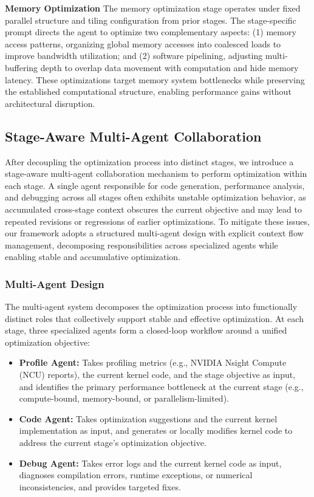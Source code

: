 \documentclass{article}
\theoremstyle{plain}
\theoremstyle{definition}
\theoremstyle{remark}
\begin{document}
\textbf{Memory Optimization}
The memory optimization stage operates under fixed parallel structure and tiling configuration from prior stages. The stage-specific prompt directs the agent to optimize two complementary aspects: (1) memory access patterns, organizing global memory accesses into coalesced loads to improve bandwidth utilization; and (2) software pipelining, adjusting multi-buffering depth to overlap data movement with computation and hide memory latency. These optimizations target memory system bottlenecks while preserving the established computational structure, enabling performance gains without architectural disruption.

\subsection{Stage-Aware Multi-Agent Collaboration}

After decoupling the optimization process into distinct stages, we introduce a stage-aware multi-agent collaboration mechanism to perform optimization within each stage. A single agent responsible for code generation, performance analysis, and debugging across all stages often exhibits unstable optimization behavior, as accumulated cross-stage context obscures the current objective and may lead to repeated revisions or regressions of earlier optimizations. To mitigate these issues, our framework adopts a structured multi-agent design with explicit context flow management, decomposing responsibilities across specialized agents while enabling stable and accumulative optimization.

\subsubsection{Multi-Agent Design}
The multi-agent system decomposes the optimization process into functionally distinct roles that collectively support stable and effective optimization. At each stage, three specialized agents form a closed-loop workflow around a unified optimization objective:
\begin{itemize}
\item \textbf{Profile Agent:} Takes profiling metrics (e.g., NVIDIA Nsight Compute (NCU) reports), the current kernel code, and the stage objective as input, and identifies the primary performance bottleneck at the current stage (e.g., compute-bound, memory-bound, or parallelism-limited).

\item \textbf{Code Agent:} Takes optimization suggestions and the current kernel implementation as input, and generates or locally modifies kernel code to address the current stage's optimization objective.

\item \textbf{Debug Agent:} Takes error logs and the current kernel code as input, diagnoses compilation errors, runtime exceptions, or numerical inconsistencies, and provides targeted fixes.
\end{itemize}
\end{document}
